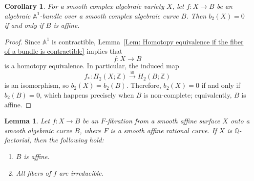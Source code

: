 \documentclass[12pt,reqno,twoside]{amsart}
\newtheorem{lemma}[theorem]{Lemma}
\newtheorem{cor}[theorem]{Corollary}
\theoremstyle{definition}
\numberwithin{equation}{section}
\newcommand{\A}{\mathbb{A}}
\newcommand{\Q}{\mathbb{Q}}
\newcommand{\Z}{\mathbb{Z}}
\begin{document}
\begin{cor}\label{Cor: b_2 of an A^1-bundle}
For a smooth complex algebraic variety $X$, let $f \colon X \to B$ be an algebraic $\A^1$-bundle over a smooth complex algebraic curve $B$. Then $b_2(X) = 0$ if and only if $B$ is affine.
\end{cor}

\begin{proof}
Since $\A^1$ is contractible, Lemma~\ref{Lem: Homotopy equivalence if the fiber of a bundle is contractible} implies that 
\[
f \colon X \to B
\]
is a homotopy equivalence. In particular, the induced map
\[
f_\ast \colon H_2(X; \Z) \xrightarrow{\ \cong\ } H_2(B; \Z)
\]
is an isomorphism, so $b_2(X) = b_2(B)$. Therefore, $b_2(X) = 0$ if and only if $b_2(B) = 0$, which happens precisely when $B$ is non-complete; equivalently, $B$ is affine.
\end{proof}


\begin{lemma}\label{Lem: Q-factorial fibration}
Let $f: X \to B$ be an $F$-fibration from a smooth affine surface $X$ onto a smooth algebraic curve $B$, where $F$ is a smooth affine rational curve. If $X$ is $\Q$-factorial, then the following hold:
\begin{enumerate}[\indent\rm(1)]
    \item $B$ is affine.
    \item All fibers of $f$ are irreducible. 
\end{enumerate}
\end{lemma}
\end{document}
